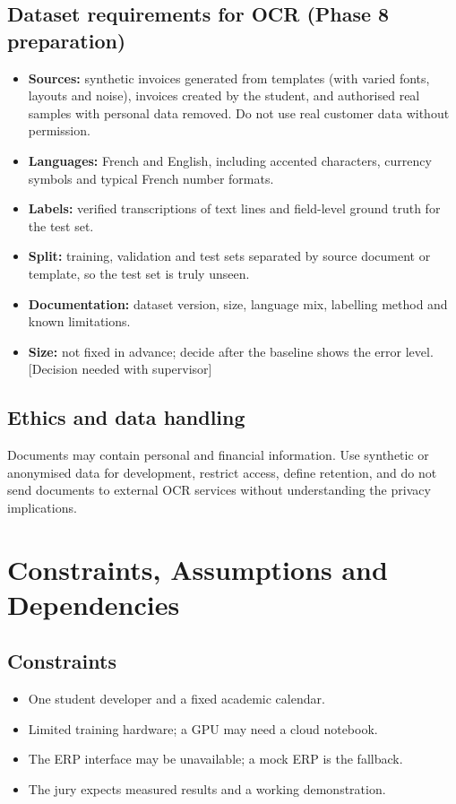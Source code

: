 \documentclass[11pt,a4paper]{report}
\begin{document}
\section{Dataset requirements for OCR (Phase 8 preparation)}
\begin{itemize}
\item \textbf{Sources:} synthetic invoices generated from templates (with varied fonts, layouts and noise), invoices created by the student, and authorised real samples with personal data removed. Do not use real customer data without permission.
\item \textbf{Languages:} French and English, including accented characters, currency symbols and typical French number formats.
\item \textbf{Labels:} verified transcriptions of text lines and field-level ground truth for the test set.
\item \textbf{Split:} training, validation and test sets separated by source document or template, so the test set is truly unseen.
\item \textbf{Documentation:} dataset version, size, language mix, labelling method and known limitations.
\item \textbf{Size:} not fixed in advance; decide after the baseline shows the error level. [Decision needed with supervisor]
\end{itemize}

\section{Ethics and data handling}
Documents may contain personal and financial information. Use synthetic or anonymised data for development, restrict access, define retention, and do not send documents to external OCR services without understanding the privacy implications.

\chapter{Constraints, Assumptions and Dependencies}
\section{Constraints}
\begin{itemize}
\item One student developer and a fixed academic calendar.
\item Limited training hardware; a GPU may need a cloud notebook.
\item The ERP interface may be unavailable; a mock ERP is the fallback.
\item The jury expects measured results and a working demonstration.
\end{itemize}
\end{document}
